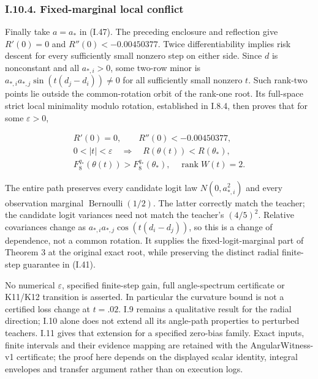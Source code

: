 \documentclass{article}
\begin{document}
\subsubsection*{I.10.4. Fixed-marginal local
conflict}\label{i.10.4.-fixed-marginal-local-conflict}

Finally take \(a=a_*\) in (I.47). The preceding enclosure and reflection
give \(R'(0)=0\) and \(R''(0)<-0.00450377\). Twice differentiability
implies risk descent for every sufficiently small nonzero step on either
side. Since \(d\) is nonconstant and all \(a_{*,i}>0\), some two-row
minor is \(a_{*,i}a_{*,j}\sin(t(d_j-d_i))\ne0\) for all sufficiently
small nonzero \(t\). Such rank-two points lie outside the
common-rotation orbit of the rank-one root. Its full-space strict local
minimality modulo rotation, established in I.8.4, then proves that for
some \(\varepsilon>0\),

\[
\begin{gathered}
R'(0)=0,\qquad R''(0)<-0.00450377,\\
0<|t|<\varepsilon\quad\Longrightarrow\quad
R(\theta(t))<R(\theta_*),\\
F_8^{q_*}(\theta(t))>F_8^{q_*}(\theta_*),\quad\operatorname{rank}W(t)=2.
\end{gathered}
\tag{I.55}
\]

The entire path preserves every candidate logit law \(N(0,a_{*,i}^2)\)
and every observation marginal \(\operatorname{Bernoulli}(1/2)\). The
latter correctly match the teacher; the candidate logit variances need
not match the teacher's \((4/5)^2\). Relative covariances change as
\(a_{*,i}a_{*,j}\cos(t(d_i-d_j))\), so this is a change of dependence,
not a common rotation. It supplies the fixed-logit-marginal part of
Theorem 3 at the original exact root, while preserving the distinct
radial finite-step guarantee in (I.41).

No numerical \(\varepsilon\), specified finite-step gain, full
angle-spectrum certificate or K11/K12 transition is asserted. In
particular the curvature bound is not a certified loss change at
\(t=.02\). I.9 remains a qualitative result for the radial direction;
I.10 alone does not extend all its angle-path properties to perturbed
teachers. I.11 gives that extension for a specified zero-bias family.
Exact inputs, finite intervals and their evidence mapping are retained
with the AngularWitness-v1 certificate; the proof here depends on the
displayed scalar identity, integral envelopes and transfer argument
rather than on execution logs.
\end{document}

